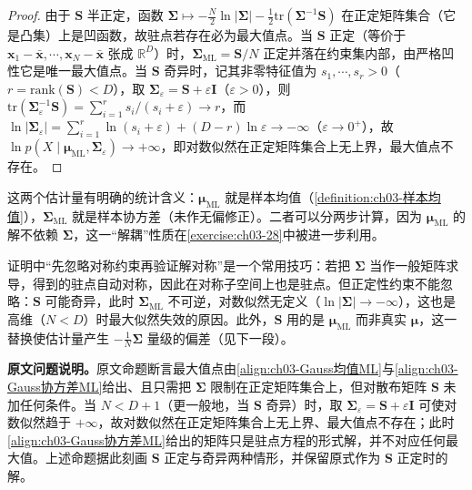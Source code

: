 \documentclass[../../main.tex]{subfiles}
\begin{document}
\begin{proof}
由于 $\boldsymbol{S}$ 半正定，函数 $\boldsymbol{\Sigma}\mapsto-\frac{N}{2}\ln\lvert\boldsymbol{\Sigma}\rvert-\frac{1}{2}\mathrm{tr}(\boldsymbol{\Sigma}^{-1}\boldsymbol{S})$ 在正定矩阵集合（它是凸集）上是凹函数，故驻点若存在必为最大值点。当 $\boldsymbol{S}$ 正定（等价于 $\boldsymbol{x}_1-\bar{\boldsymbol{x}},\cdots,\boldsymbol{x}_N-\bar{\boldsymbol{x}}$ 张成 $\mathbb{R}^{D}$）时，$\boldsymbol{\Sigma}_{\mathrm{ML}}=\boldsymbol{S}/N$ 正定并落在约束集内部，由严格凹性它是唯一最大值点。当 $\boldsymbol{S}$ 奇异时，记其非零特征值为 $s_1,\cdots,s_r>0$（$r=\mathrm{rank}(\boldsymbol{S})<D$），取 $\boldsymbol{\Sigma}_\varepsilon=\boldsymbol{S}+\varepsilon\boldsymbol{I}$（$\varepsilon>0$），则 $\mathrm{tr}(\boldsymbol{\Sigma}_\varepsilon^{-1}\boldsymbol{S})=\sum_{i=1}^{r}s_i/(s_i+\varepsilon)\to r$，而 $\ln\lvert\boldsymbol{\Sigma}_\varepsilon\rvert=\sum_{i=1}^{r}\ln(s_i+\varepsilon)+(D-r)\ln\varepsilon\to-\infty$（$\varepsilon\to0^{+}$），故 $\ln p(X\mid\boldsymbol{\mu}_{\mathrm{ML}},\boldsymbol{\Sigma}_\varepsilon)\to+\infty$，即对数似然在正定矩阵集合上无上界，最大值点不存在。
\end{proof}

\begin{remark}
这两个估计量有明确的统计含义：$\boldsymbol{\mu}_{\mathrm{ML}}$ 就是样本均值（\cref{definition:ch03-样本均值}），$\boldsymbol{\Sigma}_{\mathrm{ML}}$ 就是样本协方差（未作无偏修正）。二者可以分两步计算，因为 $\boldsymbol{\mu}_{\mathrm{ML}}$ 的解不依赖 $\boldsymbol{\Sigma}$，这一“解耦”性质在\cref{exercise:ch03-28}中被进一步利用。

证明中“先忽略对称约束再验证解对称”是一个常用技巧：若把 $\boldsymbol{\Sigma}$ 当作一般矩阵求导，得到的驻点自动对称，因此在对称子空间上也是驻点。但正定性约束不能忽略：$\boldsymbol{S}$ 可能奇异，此时 $\boldsymbol{\Sigma}_{\mathrm{ML}}$ 不可逆，对数似然无定义（$\ln\lvert\boldsymbol{\Sigma}\rvert\to-\infty$），这也是高维（$N<D$）时最大似然失效的原因。此外，$\boldsymbol{S}$ 用的是 $\boldsymbol{\mu}_{\mathrm{ML}}$ 而非真实 $\boldsymbol{\mu}$，这一替换使估计量产生 $-\frac{1}{N}\boldsymbol{\Sigma}$ 量级的偏差（见下一段）。

\textbf{原文问题说明。}原文命题断言最大值点由\eqref{align:ch03-Gauss均值ML}与\eqref{align:ch03-Gauss协方差ML}给出、且只需把 $\boldsymbol{\Sigma}$ 限制在正定矩阵集合上，但对散布矩阵 $\boldsymbol{S}$ 未加任何条件。当 $N<D+1$（更一般地，当 $\boldsymbol{S}$ 奇异）时，取 $\boldsymbol{\Sigma}_\varepsilon=\boldsymbol{S}+\varepsilon\boldsymbol{I}$ 可使对数似然趋于 $+\infty$，故对数似然在正定矩阵集合上无上界、最大值点不存在；此时\eqref{align:ch03-Gauss协方差ML}给出的矩阵只是驻点方程的形式解，并不对应任何最大值。上述命题据此刻画 $\boldsymbol{S}$ 正定与奇异两种情形，并保留原式作为 $\boldsymbol{S}$ 正定时的解。
\end{remark}
\end{document}
